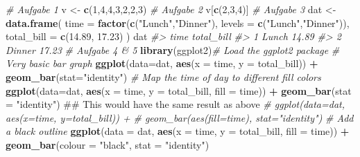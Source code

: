 \documentclass[]{article}
\newenvironment{Shaded}{\begin{snugshade}}{\end{snugshade}}
\newcommand{\KeywordTok}[1]{\textcolor[rgb]{0.13,0.29,0.53}{\textbf{#1}}}
\newcommand{\DataTypeTok}[1]{\textcolor[rgb]{0.13,0.29,0.53}{#1}}
\newcommand{\DecValTok}[1]{\textcolor[rgb]{0.00,0.00,0.81}{#1}}
\newcommand{\FloatTok}[1]{\textcolor[rgb]{0.00,0.00,0.81}{#1}}
\newcommand{\StringTok}[1]{\textcolor[rgb]{0.31,0.60,0.02}{#1}}
\newcommand{\CommentTok}[1]{\textcolor[rgb]{0.56,0.35,0.01}{\textit{#1}}}
\newcommand{\OperatorTok}[1]{\textcolor[rgb]{0.81,0.36,0.00}{\textbf{#1}}}
\newcommand{\NormalTok}[1]{#1}
\begin{document}
\begin{Shaded}
\begin{Highlighting}[]
  \CommentTok{# Aufgabe 1}
\NormalTok{    v <-}\StringTok{ }\KeywordTok{c}\NormalTok{(}\DecValTok{1}\NormalTok{,}\DecValTok{4}\NormalTok{,}\DecValTok{4}\NormalTok{,}\DecValTok{3}\NormalTok{,}\DecValTok{2}\NormalTok{,}\DecValTok{2}\NormalTok{,}\DecValTok{3}\NormalTok{)}
  \CommentTok{# Aufgabe 2}
\NormalTok{    v[}\KeywordTok{c}\NormalTok{(}\DecValTok{2}\NormalTok{,}\DecValTok{3}\NormalTok{,}\DecValTok{4}\NormalTok{)]}
  \CommentTok{# Aufgabe 3}
\NormalTok{    dat <-}\StringTok{ }\KeywordTok{data.frame}\NormalTok{(}
      \DataTypeTok{time =} \KeywordTok{factor}\NormalTok{(}\KeywordTok{c}\NormalTok{(}\StringTok{"Lunch"}\NormalTok{,}\StringTok{"Dinner"}\NormalTok{), }\DataTypeTok{levels =} \KeywordTok{c}\NormalTok{(}\StringTok{"Lunch"}\NormalTok{,}\StringTok{"Dinner"}\NormalTok{)),}
      \DataTypeTok{total_bill =} \KeywordTok{c}\NormalTok{(}\FloatTok{14.89}\NormalTok{, }\FloatTok{17.23}\NormalTok{)}
\NormalTok{    )}
\NormalTok{    dat}
    \CommentTok{#>     time total_bill}
    \CommentTok{#> 1  Lunch      14.89}
    \CommentTok{#> 2 Dinner      17.23}
  \CommentTok{# Aufgabe 4 & 5}
    \KeywordTok{library}\NormalTok{(ggplot2)}\CommentTok{# Load the ggplot2 package}
    \CommentTok{# Very basic bar graph}
    \KeywordTok{ggplot}\NormalTok{(}\DataTypeTok{data=}\NormalTok{dat, }\KeywordTok{aes}\NormalTok{(}\DataTypeTok{x =}\NormalTok{ time, }\DataTypeTok{y =}\NormalTok{ total_bill)) }\OperatorTok{+}
\StringTok{      }\KeywordTok{geom_bar}\NormalTok{(}\DataTypeTok{stat=}\StringTok{"identity"}\NormalTok{)}
    \CommentTok{# Map the time of day to different fill colors}
    \KeywordTok{ggplot}\NormalTok{(}\DataTypeTok{data=}\NormalTok{dat, }\KeywordTok{aes}\NormalTok{(}\DataTypeTok{x =}\NormalTok{ time, }\DataTypeTok{y =}\NormalTok{ total_bill, }\DataTypeTok{fill =}\NormalTok{ time)) }\OperatorTok{+}
\StringTok{      }\KeywordTok{geom_bar}\NormalTok{(}\DataTypeTok{stat =} \StringTok{"identity"}\NormalTok{)}
\NormalTok{    ## This would have the same result as above}
    \CommentTok{# ggplot(data=dat, aes(x=time, y=total_bill)) +}
    \CommentTok{#    geom_bar(aes(fill=time), stat="identity")}
    \CommentTok{# Add a black outline}
    \KeywordTok{ggplot}\NormalTok{(}\DataTypeTok{data =}\NormalTok{ dat, }\KeywordTok{aes}\NormalTok{(}\DataTypeTok{x =}\NormalTok{ time, }\DataTypeTok{y =}\NormalTok{ total_bill, }\DataTypeTok{fill =}\NormalTok{ time)) }\OperatorTok{+}
\StringTok{      }\KeywordTok{geom_bar}\NormalTok{(}\DataTypeTok{colour =} \StringTok{"black"}\NormalTok{, }\DataTypeTok{stat =} \StringTok{"identity"}\NormalTok{)}

\end{Highlighting}
\end{Shaded}
\end{document}
